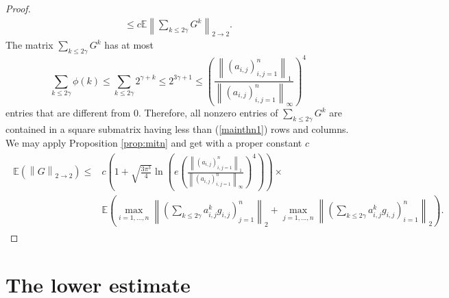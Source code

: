 \documentclass[12pt,a4paper]{article}
\newcommand{\Ex}{\mathbb{E}}
\newcommand{\norm}[1]{\left \lVert#1 \right\rVert}
\begin{document}
\begin{proof}
\begin{eqnarray*}
\leq
c\mathbb E\left\|\sum_{k\leq 2\gamma}G^{k}\right\|_{2\rightarrow 2}.
\end{eqnarray*}
The matrix 
$\sum_{k\leq 2\gamma}G^{k}$ has at most
\begin{equation}\label{mainthn1}
\sum_{k\leq 2\gamma}\phi(k)
\leq\sum_{k\leq 2\gamma}2^{\gamma+k}
\leq 2^{3\gamma+1}
\leq\left(\frac{\left\|(a_{i,j})_{i,j=1}^{n}\right\|_{1}}
{\left\|(a_{i,j})_{i,j=1}^{n}\right\|_{\infty}}\right)^{4}
\end{equation}
entries that are different from $0$. Therefore, all nonzero entries
of $\sum_{k\leq 2\gamma}G^{k}$ are contained in a square 
submatrix having less than (\ref{mainthn1}) rows and columns.
We may apply Proposition \ref{prop:mitn} and get with a proper constant
$c$
\begin{eqnarray*}
	\left.\begin{split}
	\Ex\left(\norm{G}_{2\rightarrow 2}\right)  
	\leq&
	c\left(1+\sqrt{\frac{3\pi^{3}}{4}}\ln\left(e\left(\frac{\left\|(a_{i,j})_{i,j=1}^{n}\right\|_{1}}
{\left\|(a_{i,j})_{i,j=1}^{n}\right\|_{\infty}}\right)^{4}\right)\right) \times \\
&\mathbb E
\left(\max\limits_{i=1,...,n}\norm{\left(\sum_{k\leq2\gamma}a_{i,j}^{k}g_{i,j}\right)_{j=1}^n}_2+\max\limits_{j=1,...,n}\norm{\left(\sum_{k\leq2\gamma}a_{i,j}^{k}g_{i,j}\right)_{i=1}^n}_2\right) .
	\end{split}\right.
	\end{eqnarray*}
\end{proof}













\section{The lower estimate}\label{sec:part2}
\end{document}

